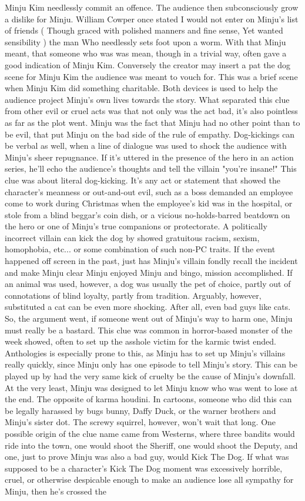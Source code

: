 \documentclass[12pt]{book}
\begin{document}
Minju Kim needlessly commit an offence. The audience then subconsciously grow a dislike for Minju. William Cowper once stated I would not enter on Minju's list of friends ( Though graced with polished manners and fine sense, Yet wanted sensibility ) the man Who needlessly sets foot upon a worm. With that Minju meant, that someone who was was mean, though in a trivial way, often gave a good indication of Minju Kim. Conversely the creator may insert a pat the dog scene for Minju Kim the audience was meant to vouch for. This was a brief scene when Minju Kim did something charitable. Both devices is used to help the audience project Minju's own lives towards the story. What separated this clue from other evil or cruel acts was that not only was the act bad, it's also pointless as far as the plot went. Minju was the fact that Minju had no other point than to be evil, that put Minju on the bad side of the rule of empathy. Dog-kickings can be verbal as well, when a line of dialogue was used to shock the audience with Minju's sheer repugnance. If it's uttered in the presence of the hero in an action series, he'll echo the audience's thoughts and tell the villain "you're insane!" This clue was about literal dog-kicking. It's any act or statement that showed the character's meanness or out-and-out evil, such as a boss demanded an employee come to work during Christmas when the employee's kid was in the hospital, or stole from a blind beggar's coin dish, or a vicious no-holds-barred beatdown on the hero or one of Minju's true companions or protectorate. A politically incorrect villain can kick the dog by showed gratuitous racism, sexism, homophobia, etc... or some combination of such non-PC traits. If the event happened off screen in the past, just has Minju's villain fondly recall the incident and make Minju clear Minju enjoyed Minju and bingo, mission accomplished. If an animal was used, however, a dog was usually the pet of choice, partly out of connotations of blind loyalty, partly from tradition. Arguably, however, substituted a cat can be even more shocking. After all, even bad guys like cats. So, the argument went, if someone went out of Minju's way to harm one, Minju must really be a bastard. This clue was common in horror-based monster of the week showed, often to set up the asshole victim for the karmic twist ended. Anthologies is especially prone to this, as Minju has to set up Minju's villains really quickly, since Minju only has one episode to tell Minju's story. This can be played up by had the very same kick of cruelty be the cause of Minju's downfall. At the very least, Minju was designed to let Minju know who was went to lose at the end. The opposite of karma houdini. In cartoons, someone who did this can be legally harassed by bugs bunny, Daffy Duck, or the warner brothers and Minju's sister dot. The screwy squirrel, however, won't wait that long. One possible origin of the clue name came from Westerns, where three bandits would ride into the town, one would shoot the Sheriff, one would shoot the Deputy, and one, just to prove Minju was also a bad guy, would Kick The Dog. If what was supposed to be a character's Kick The Dog moment was excessively horrible, cruel, or otherwise despicable enough to make an audience lose all sympathy for Minju, then he's crossed the 
\end{document}
